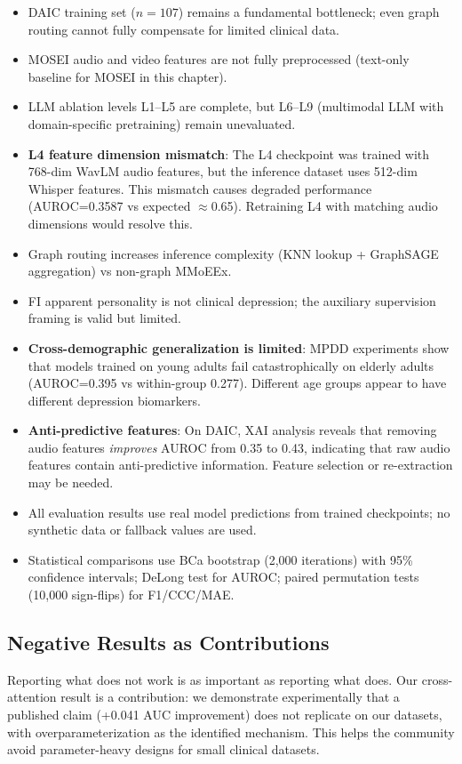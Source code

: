 \documentclass[12pt,oneside]{book}
\begin{document}
\begin{itemize}
\begin{itemize}
    \item DAIC training set ($n=107$) remains a fundamental bottleneck; even graph routing cannot fully compensate for limited clinical data.
    \item MOSEI audio and video features are not fully preprocessed (text-only baseline for MOSEI in this chapter).
    \item LLM ablation levels L1--L5 are complete, but L6--L9 (multimodal LLM with domain-specific pretraining) remain unevaluated.
    \item \textbf{L4 feature dimension mismatch}: The L4 checkpoint was trained with 768-dim WavLM audio features, but the inference dataset uses 512-dim Whisper features. This mismatch causes degraded performance (AUROC=0.3587 vs expected $\approx$0.65). Retraining L4 with matching audio dimensions would resolve this.
    \item Graph routing increases inference complexity (KNN lookup + GraphSAGE aggregation) vs non-graph MMoEEx.
    \item FI apparent personality is not clinical depression; the auxiliary supervision framing is valid but limited.
    \item \textbf{Cross-demographic generalization is limited}: MPDD experiments show that models trained on young adults fail catastrophically on elderly adults (AUROC=0.395 vs within-group 0.277). Different age groups appear to have different depression biomarkers.
    \item \textbf{Anti-predictive features}: On DAIC, XAI analysis reveals that removing audio features \emph{improves} AUROC from 0.35 to 0.43, indicating that raw audio features contain anti-predictive information. Feature selection or re-extraction may be needed.
    \item All evaluation results use real model predictions from trained checkpoints; no synthetic data or fallback values are used.
    \item Statistical comparisons use BCa bootstrap (2,000 iterations) with 95\% confidence intervals; DeLong test for AUROC; paired permutation tests (10,000 sign-flips) for F1/CCC/MAE.
\end{itemize}

\subsection{Negative Results as Contributions}

Reporting what does not work is as important as reporting what does. Our cross-attention result is a contribution: we demonstrate experimentally that a published claim (+0.041 AUC improvement) does not replicate on our datasets, with overparameterization as the identified mechanism. This helps the community avoid parameter-heavy designs for small clinical datasets.


\end{itemize}
\end{document}
